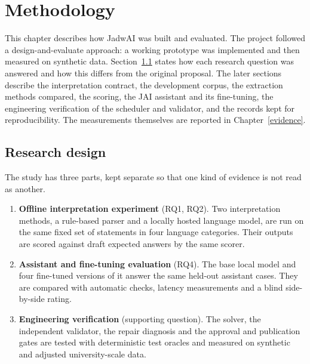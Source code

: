 \chapter{Methodology}\label{methodology-proposed-study}

This chapter describes how JadwAI was built and evaluated. The project followed a design-and-evaluate approach: a working prototype was implemented and then measured on synthetic data. Section~\ref{meth-design} states how each research question was answered and how this differs from the original proposal. The later sections describe the interpretation contract, the development corpus, the extraction methods compared, the scoring, the JAI assistant and its fine-tuning, the engineering verification of the scheduler and validator, and the records kept for reproducibility. The measurements themselves are reported in Chapter~\ref{evidence}.

\section{Research design}\label{meth-design}

The study has three parts, kept separate so that one kind of evidence is not read as another.

\begin{enumerate}
\item \textbf{Offline interpretation experiment} (RQ1, RQ2). Two interpretation methods, a rule-based parser and a locally hosted language model, are run on the same fixed set of statements in four language categories. Their outputs are scored against draft expected answers by the same scorer.
\item \textbf{Assistant and fine-tuning evaluation} (RQ4). The base local model and four fine-tuned versions of it answer the same held-out assistant cases. They are compared with automatic checks, latency measurements and a blind side-by-side rating.
\item \textbf{Engineering verification} (supporting question). The solver, the independent validator, the repair diagnosis and the approval and publication gates are tested with deterministic test oracles and measured on synthetic and adjusted university-scale data.
\end{enumerate}


